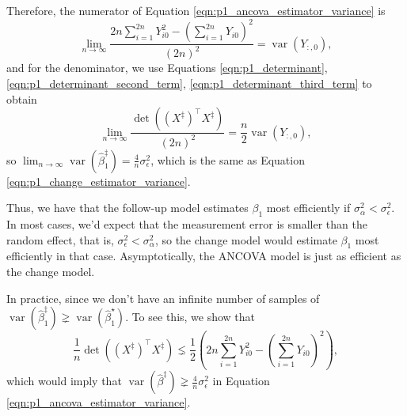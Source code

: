 \documentclass[letterpaper,11pt]{article}
\begin{document}
\begin{enumerate}
\begin{enumerate}
\begin{description}
\begin{description}
        Therefore, the numerator of Equation
        \ref{eqn:p1_ancova_estimator_variance} is
        \begin{equation}
          \lim_{n\rightarrow\infty}\frac{
            2n\sum_{i=1}^{2n} Y_{i0}^2 - \left(\sum_{i=1}^{2n}Y_{i0}\right)^2}{\left(2n\right)^2}
          = \operatorname{var}\left(Y_{:,0}\right),
        \end{equation}
        and for the denominator, we use Equations
        \ref{eqn:p1_determinant}, \ref{eqn:p1_determinant_second_term},
        \ref{eqn:p1_determinant_third_term} to obtain
        \begin{equation}
          \lim_{n\rightarrow\infty}\frac{
            \det\left(\left(X^\ddagger\right)^\intercal X^\ddagger\right)}{\left(2n\right)^2}
          = \frac{n}{2}\operatorname{var}\left(Y_{:,0}\right),
        \end{equation}
        so
        $\lim_{n\rightarrow\infty}
        \operatorname{var}\left(\hat{\beta}_1^\ddagger\right) =
        \frac{4}{n}\sigma_\epsilon^2$, which is the same as Equation
        \ref{eqn:p1_change_estimator_variance}.
      \end{description}

      Thus, we have that the follow-up model estimates $\beta_1$ most
      efficiently if $\sigma_\alpha^2 < \sigma_\epsilon^2$. In most cases, we'd
      expect that the measurement error is smaller than the random effect, that
      is, $\sigma_\epsilon^2 < \sigma_\alpha^2$, so the change model would
      estimate $\beta_1$ most efficiently in that case. Asymptotically, the
      ANCOVA model is just as efficient as the change model.

      In practice, since we don't have an infinite number of samples of
      $\operatorname{var}\left(\hat{\beta}_1^\ddagger\right) \gneq
      \operatorname{var}\left(\hat{\beta}_1^\star\right)$. To see this, we show
      that
      \begin{equation}
        \frac{1}{n}\det\left(\left(X^\ddagger\right)^\intercal X^\ddagger\right) \lneq
        \frac{1}{2}\left(2n\sum_{i=1}^{2n} Y_{i0}^2 - \left(\sum_{i=1}^{2n}Y_{i0}\right)^2\right),
        \label{eqn:p1_determinant_inequality}
      \end{equation}
      which would imply that
      $\operatorname{var}\left(\hat{\beta}^\ddagger\right) \gneq
      \frac{4}{n}\sigma_\epsilon^2$ in Equation
      \ref{eqn:p1_ancova_estimator_variance}.


\end{description}
\end{enumerate}
\end{enumerate}
\end{document}
